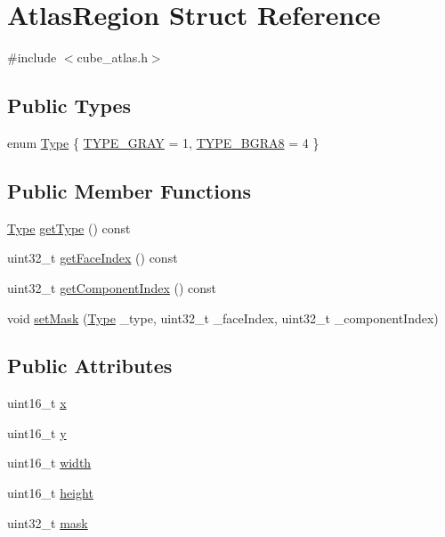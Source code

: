 \hypertarget{struct_atlas_region}{\section{Atlas\+Region Struct Reference}
\label{struct_atlas_region}
}


{\ttfamily \#include $<$cube\+\_\+atlas.\+h$>$}

\subsection*{Public Types}
\begin{DoxyCompactItemize}
\item 
enum \hyperlink{struct_atlas_region_a51d027756a617938bf45be832663e2c2}{Type} \{ \hyperlink{struct_atlas_region_a51d027756a617938bf45be832663e2c2aec663ca56a7d66e0b922d88131dc9798}{T\+Y\+P\+E\+\_\+\+G\+R\+A\+Y} = 1, 
\hyperlink{struct_atlas_region_a51d027756a617938bf45be832663e2c2a3010705c5f10ae5b40dee6de2fb1bb63}{T\+Y\+P\+E\+\_\+\+B\+G\+R\+A8} = 4
 \}
\end{DoxyCompactItemize}
\subsection*{Public Member Functions}
\begin{DoxyCompactItemize}
\item 
\hyperlink{struct_atlas_region_a51d027756a617938bf45be832663e2c2}{Type} \hyperlink{struct_atlas_region_ac0119bcd6c0708be53150750da1b14db}{get\+Type} () const 
\item 
uint32\+\_\+t \hyperlink{struct_atlas_region_a868214ea44b37129d280ffa29a5836f5}{get\+Face\+Index} () const 
\item 
uint32\+\_\+t \hyperlink{struct_atlas_region_aadbfc210bb2f858876d57e6ed81b4eee}{get\+Component\+Index} () const 
\item 
void \hyperlink{struct_atlas_region_a8e0e8a5910793d07903a5f04bb13a355}{set\+Mask} (\hyperlink{struct_atlas_region_a51d027756a617938bf45be832663e2c2}{Type} \+\_\+type, uint32\+\_\+t \+\_\+face\+Index, uint32\+\_\+t \+\_\+component\+Index)
\end{DoxyCompactItemize}
\subsection*{Public Attributes}
\begin{DoxyCompactItemize}
\item 
uint16\+\_\+t \hyperlink{struct_atlas_region_aee785d751de233eac49a4bb9ea27bd70}{x}
\item 
uint16\+\_\+t \hyperlink{struct_atlas_region_a27b91687289b01babe0625c869d216b3}{y}
\item 
uint16\+\_\+t \hyperlink{struct_atlas_region_afa487dd2e5e49d4e873d505b8b3d413e}{width}
\item 
uint16\+\_\+t \hyperlink{struct_atlas_region_a383ffd5dad4c058768ad4d5c45b118dd}{height}
\item 
uint32\+\_\+t \hyperlink{struct_atlas_region_a4a74c2abe0122654d0c0905d1fd54d2d}{mask}
\end{DoxyCompactItemize}


